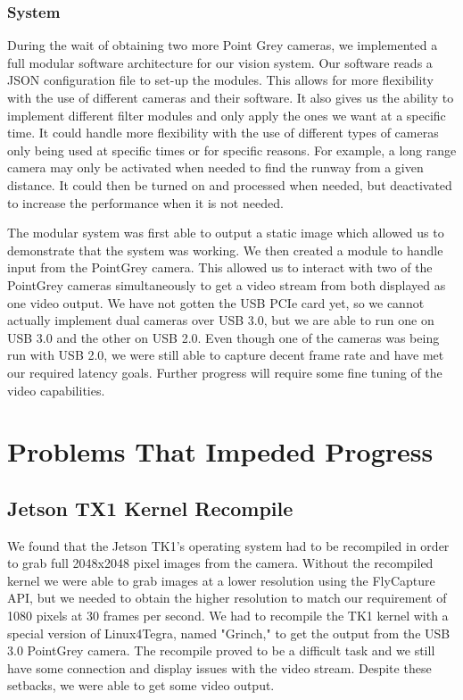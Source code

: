 \documentclass[letterpaper,10pt,titlepage]{IEEEtran}
\begin{document}
   \subsubsection{System}
   During the wait of obtaining two more Point Grey cameras, we implemented a full modular software architecture for our vision system. Our software reads a JSON configuration file to set-up the modules. This allows for more flexibility with the use of different cameras and their software. It also gives us the ability to implement different filter modules and only apply the ones we want at a specific time. It could handle more flexibility with the use of different types of cameras only being used at specific times or for specific reasons. For example, a long range camera may only be activated when needed to find the runway from a given distance. It could then be turned on and processed when needed, but deactivated to increase the performance when it is not needed.\\ 
\par
The modular system was first able to output a static image which allowed us to demonstrate that the system was working. We then created a module to handle input from the PointGrey camera. This allowed us to interact with two of the PointGrey cameras simultaneously to get a video stream from both displayed as one video output. We have not gotten the USB PCIe card yet, so we cannot actually implement dual cameras over USB 3.0, but we are able to run one on USB 3.0 and the other on USB 2.0. Even though one of the cameras was being run with USB 2.0, we were still able to capture decent frame rate and have met our required latency goals. Further progress will require some fine tuning of the video capabilities.
   
   \section{Problems That Impeded Progress}
   \subsection{Jetson TX1 Kernel Recompile}
   We found that the Jetson TK1's operating system had to be recompiled in order to grab full 2048x2048 pixel images from the camera. Without the recompiled kernel we were able to grab images at a lower resolution using the FlyCapture API, but we needed to obtain the higher resolution to match our requirement of 1080 pixels at 30 frames per second. We had to recompile the TK1 kernel with a special version of Linux4Tegra, named "Grinch," to get the output from the USB 3.0 PointGrey camera. The recompile proved to be a difficult task and we still have some connection and display issues with the video stream. Despite these setbacks, we were able to get some video output.	
   
\end{document}
